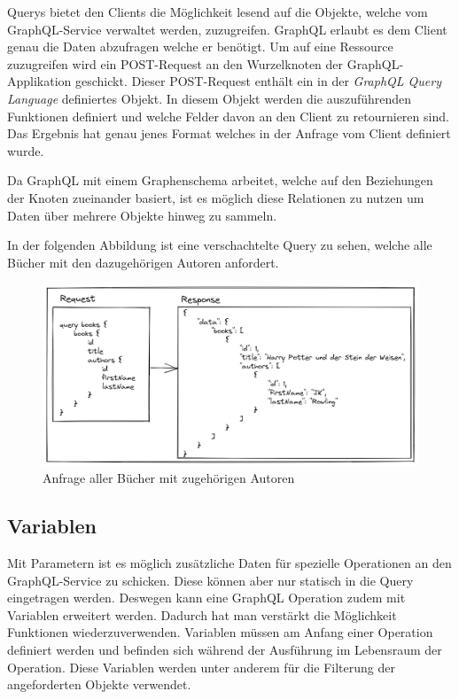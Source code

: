 Querys bietet den Clients die Möglichkeit lesend auf die Objekte, welche vom GraphQL-Service verwaltet werden, zuzugreifen.
GraphQL erlaubt es dem Client genau die Daten abzufragen welche er benötigt.
Um auf eine Ressource zuzugreifen wird ein POST-Request an den Wurzelknoten der GraphQL-Applikation geschickt.
Dieser POST-Request enthält ein in der \textit{GraphQL Query Language} definiertes Objekt.
In diesem Objekt werden die auszuführenden Funktionen definiert und welche Felder davon an den Client zu retournieren sind.
Das Ergebnis hat genau jenes Format welches in der Anfrage vom Client definiert wurde.

Da GraphQL mit einem Graphenschema arbeitet, welche auf den Beziehungen der Knoten zueinander basiert, ist es möglich diese Relationen zu nutzen um Daten über mehrere Objekte hinweg zu sammeln.
\newline


In der folgenden Abbildung ist eine verschachtelte Query zu sehen, welche alle Bücher mit den dazugehörigen Autoren anfordert.

\begin{figure}[H]
    \includegraphics[width=\textwidth]{pics/query_book_with_result.png}
    \caption{Anfrage aller Bücher mit zugehörigen Autoren}
\end{figure}

\subsection{Variablen}
Mit Parametern ist es möglich zusätzliche Daten für spezielle Operationen an den GraphQL-Service zu schicken.
Diese können aber nur statisch in die Query eingetragen werden.
Deswegen kann eine GraphQL Operation zudem mit Variablen erweitert werden.
Dadurch hat man verstärkt die Möglichkeit Funktionen wiederzuverwenden.
Variablen müssen am Anfang einer Operation definiert werden und befinden sich während der Ausführung im Lebensraum der Operation.
Diese Variablen werden unter anderem für die Filterung der angeforderten Objekte verwendet.
\newline

